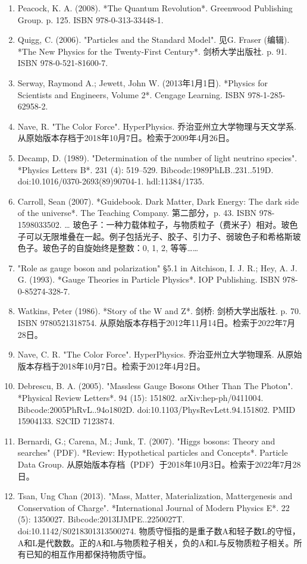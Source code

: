 \begin{enumerate}
\item Peacock, K. A. (2008). *The Quantum Revolution*. Greenwood Publishing Group. p. 125. ISBN 978-0-313-33448-1.
\item Quigg, C. (2006). "Particles and the Standard Model". 见G. Fraser (编辑). *The New Physics for the Twenty-First Century*. 剑桥大学出版社. p. 91. ISBN 978-0-521-81600-7.
\item Serway, Raymond A.; Jewett, John W. (2013年1月1日). *Physics for Scientists and Engineers, Volume 2*. Cengage Learning. ISBN 978-1-285-62958-2.
\item Nave, R. "The Color Force". HyperPhysics. 乔治亚州立大学物理与天文学系. 从原始版本存档于2018年10月7日。检索于2009年4月26日。
\item Decamp, D. (1989). "Determination of the number of light neutrino species". *Physics Letters B*. 231 (4): 519–529. Bibcode:1989PhLB..231..519D. doi:10.1016/0370-2693(89)90704-1. hdl:11384/1735.
\item Carroll, Sean (2007). *Guidebook. Dark Matter, Dark Energy: The dark side of the universe*. The Teaching Company. 第二部分，p. 43. ISBN 978-1598033502. … 玻色子：一种力载体粒子，与物质粒子（费米子）相对。玻色子可以无限堆叠在一起。例子包括光子、胶子、引力子、弱玻色子和希格斯玻色子。玻色子的自旋始终是整数：0, 1, 2, 等等……
\item "Role as gauge boson and polarization" §5.1 in Aitchison, I. J. R.; Hey, A. J. G. (1993). *Gauge Theories in Particle Physics*. IOP Publishing. ISBN 978-0-85274-328-7.
\item Watkins, Peter (1986). *Story of the W and Z*. 剑桥: 剑桥大学出版社. p. 70. ISBN 9780521318754. 从原始版本存档于2012年11月14日。检索于2022年7月28日。
\item Nave, C. R. "The Color Force". HyperPhysics. 乔治亚州立大学物理系. 从原始版本存档于2018年10月7日。检索于2012年4月2日。
\item Debrescu, B. A. (2005). "Massless Gauge Bosons Other Than The Photon". *Physical Review Letters*. 94 (15): 151802. arXiv:hep-ph/0411004. Bibcode:2005PhRvL..94o1802D. doi:10.1103/PhysRevLett.94.151802. PMID 15904133. S2CID 7123874.
\item Bernardi, G.; Carena, M.; Junk, T. (2007). "Higgs bosons: Theory and searches" (PDF). *Review: Hypothetical particles and Concepts*. Particle Data Group. 从原始版本存档（PDF）于2018年10月3日。检索于2022年7月28日。
\item Tsan, Ung Chan (2013). "Mass, Matter, Materialization, Mattergenesis and Conservation of Charge". *International Journal of Modern Physics E*. 22 (5): 1350027. Bibcode:2013IJMPE..2250027T. doi:10.1142/S0218301313500274. 物质守恒指的是重子数A和轻子数L的守恒，A和L是代数数。正的A和L与物质粒子相关，负的A和L与反物质粒子相关。所有已知的相互作用都保持物质守恒。

\end{enumerate}
